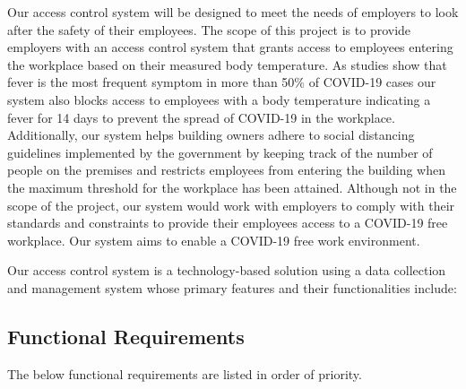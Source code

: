 Our access control system will be designed to meet the needs of employers to
look after the safety of their employees. The scope of this project is to
provide employers with an access control system that grants access to employees
entering the workplace based on their measured body temperature. As studies
show that fever is the most frequent symptom in more than 50\% of COVID-19
cases our system also blocks access to employees with a body temperature
indicating a fever for 14 days to prevent the spread of COVID-19 in the
workplace. Additionally, our system helps building owners adhere to social
distancing guidelines implemented by the government by keeping track of the
number of people on the premises and restricts employees from entering the
building when the maximum threshold for the workplace has been
attained. Although not in the scope of the project, our system would work with
employers to comply with their standards and constraints to provide their
employees access to a COVID-19 free workplace. Our system aims to enable a
COVID-19 free work environment.

Our access control system is a technology-based solution using a data collection
and management system whose primary features and their functionalities include:

\subsection{Functional Requirements}

The below functional requirements are listed in order of priority.

